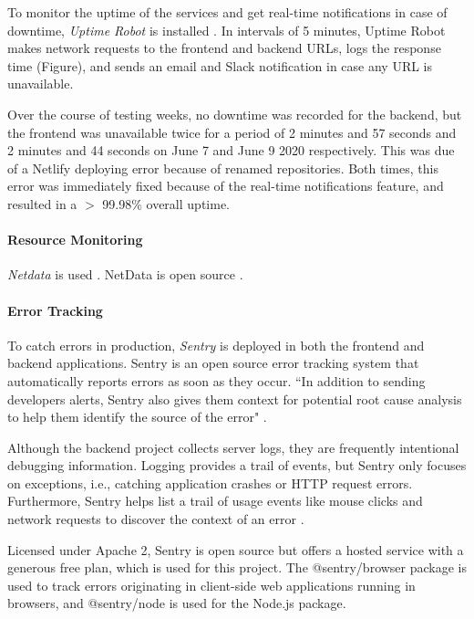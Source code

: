 \documentclass{article}
\begin{document}
To monitor the uptime of the services and get real-time notifications in case of downtime, \emph{Uptime Robot} is installed \cite{noauthor_about_nodate}. In intervals of 5 minutes, Uptime Robot makes network requests to the frontend and backend URLs, logs the response time (Figure), and sends an email and Slack notification in case any URL is unavailable.

Over the course of testing weeks, no downtime was recorded for the backend, but the frontend was unavailable twice for a period of 2 minutes and 57 seconds and 2 minutes and 44 seconds on June 7 and June 9 2020 respectively. This was due of a Netlify deploying error because of renamed repositories. Both times, this error was immediately fixed because of the real-time notifications feature, and resulted in a $>$ 99.98\% overall uptime.

\paragraph{Resource Monitoring}

\emph{Netdata} is used \cite{noauthor_netdata_nodate}. NetData is open source \cite{noauthor_netdata/netdata_2020}.

\paragraph{Error Tracking}

To catch errors in production, \emph{Sentry} is deployed in both the frontend and backend applications. Sentry is an open source error tracking system \cite{noauthor_sentry_nodate} that automatically reports errors as soon as they occur. ``In addition to sending developers alerts, Sentry also gives them context for potential root cause analysis to help them identify the source of the error" \cite{noauthor_sentry_nodate-1}.

Although the backend project collects server logs, they are frequently intentional debugging information. Logging provides a trail of events, but Sentry only focuses on exceptions, i.e., catching application crashes or HTTP request errors. Furthermore, Sentry helps list a trail of usage events like mouse clicks and network requests to discover the context of an error \cite{noauthor_sentry_nodate-2}.

Licensed under Apache 2, Sentry is open source but offers a hosted service with a generous free plan, which is used for this project. The @sentry/browser package is used to track errors originating in client-side web applications running in browsers, and @sentry/node is used for the Node.js package.
\end{document}
